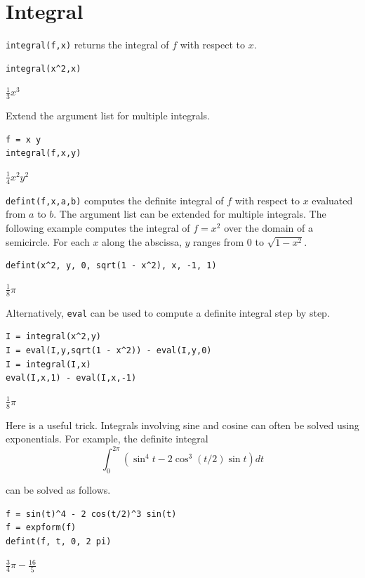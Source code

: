 
\newpage

\section{Integral}

\verb$integral(f,x)$ returns the integral of $f$ with respect to $x$.

{\color{blue}
\begin{verbatim}
integral(x^2,x)
\end{verbatim}
}

$\displaystyle \tfrac{1}{3}x^3$

\bigskip
Extend the argument list for multiple integrals.

{\color{blue}
\begin{verbatim}
f = x y
integral(f,x,y)
\end{verbatim}
}

$\displaystyle \tfrac{1}{4}x^2y^2$

\bigskip
\verb$defint(f,x,a,b)$
computes the definite integral of $f$ with respect to $x$ evaluated from
$a$ to $b$.
The argument list can be extended for multiple integrals.
The following example computes the integral of $f=x^2$
over the domain of a semicircle.
For each $x$ along the abscissa, $y$ ranges from 0 to $\sqrt{1-x^2}$.

{\color{blue}
\begin{verbatim}
defint(x^2, y, 0, sqrt(1 - x^2), x, -1, 1)
\end{verbatim}
}

$\displaystyle \tfrac{1}{8}\pi$

\bigskip
Alternatively, \verb$eval$ can be used to compute a definite integral step by step.

{\color{blue}
\begin{verbatim}
I = integral(x^2,y)
I = eval(I,y,sqrt(1 - x^2)) - eval(I,y,0)
I = integral(I,x)
eval(I,x,1) - eval(I,x,-1)
\end{verbatim}
}

$\displaystyle \tfrac{1}{8}\pi$

\bigskip
Here is a useful trick.
Integrals involving sine and cosine
can often be solved using exponentials.
For example, the definite integral
\begin{equation*}
\int_0^{2\pi}\left(\sin^4t-2\cos^3(t/2)\sin t\right)dt
\end{equation*}

can be solved as follows.

{\color{blue}
\begin{verbatim}
f = sin(t)^4 - 2 cos(t/2)^3 sin(t)
f = expform(f)
defint(f, t, 0, 2 pi)
\end{verbatim}
}

$\displaystyle \tfrac{3}{4}\pi-\tfrac{16}{5}$


